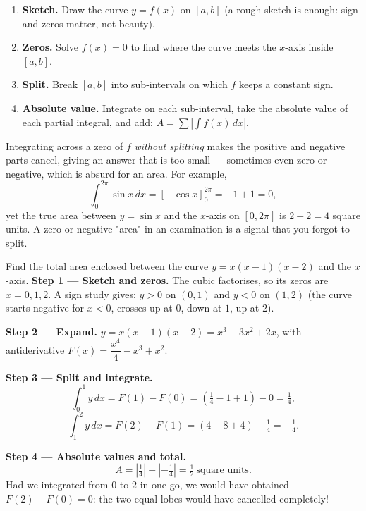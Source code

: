 \documentclass[11pt]{article}
\begin{document}
\begin{methode}
\begin{enumerate}
\item \textbf{Sketch.} Draw the curve $y = f(x)$ on $[a,b]$ (a rough sketch is enough: sign and zeros matter, not beauty).
\item \textbf{Zeros.} Solve $f(x) = 0$ to find where the curve meets the $x$-axis inside $[a,b]$.
\item \textbf{Split.} Break $[a,b]$ into sub-intervals on which $f$ keeps a constant sign.
\item \textbf{Absolute value.} Integrate on each sub-interval, take the absolute value of each partial integral, and add: $A = \sum \left|\int f(x)\,dx\right|$.
\end{enumerate}
\end{methode}

\begin{attention}
Integrating across a zero of $f$ \emph{without splitting} makes the positive and negative parts cancel, giving an answer that is too small — sometimes even zero or negative, which is absurd for an area. For example,
\[
\int_0^{2\pi} \sin x\,dx = \left[-\cos x\right]_0^{2\pi} = -1 + 1 = 0,
\]
yet the true area between $y = \sin x$ and the $x$-axis on $[0, 2\pi]$ is $2 + 2 = 4$ square units. A zero or negative "area" in an examination is a signal that you forgot to split.
\end{attention}

\begin{exoresolu}
Find the total area enclosed between the curve $y = x(x-1)(x-2)$ and the $x$-axis.
\tcblower
\textbf{Step 1 — Sketch and zeros.} The cubic factorises, so its zeros are $x = 0, 1, 2$. A sign study gives: $y > 0$ on $(0,1)$ and $y < 0$ on $(1,2)$ (the curve starts negative for $x<0$, crosses up at $0$, down at $1$, up at $2$).

\textbf{Step 2 — Expand.} $y = x(x-1)(x-2) = x^3 - 3x^2 + 2x$, with antiderivative $F(x) = \dfrac{x^4}{4} - x^3 + x^2$.

\textbf{Step 3 — Split and integrate.}
\[
\int_0^1 y\,dx = F(1) - F(0) = \left(\tfrac14 - 1 + 1\right) - 0 = \tfrac14,
\]
\[
\int_1^2 y\,dx = F(2) - F(1) = \left(4 - 8 + 4\right) - \tfrac14 = -\tfrac14.
\]

\textbf{Step 4 — Absolute values and total.}
\[
A = \left|\tfrac14\right| + \left|-\tfrac14\right| = \tfrac12\ \text{square units}.
\]
Had we integrated from $0$ to $2$ in one go, we would have obtained $F(2) - F(0) = 0$: the two equal lobes would have cancelled completely!
\end{exoresolu}
\end{document}

